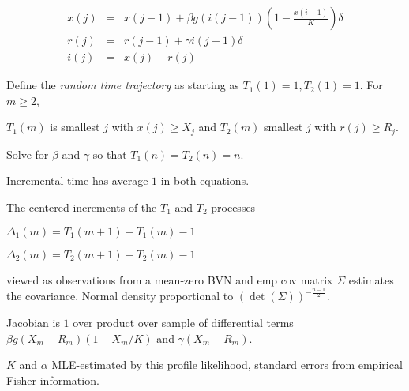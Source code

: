 \documentclass[notes]{beamer}
\begin{document}
\begin{frame}
\begin{eqnarray}
x(j)&=&x(j-1)+\beta g(i(j-1))(1-{\frac{x(i-1)}{K}}) \delta \nonumber \\
r(j)&=&r(j-1)+\gamma i(j-1) \delta \nonumber \\
i(j)&=&x(j)-r(j)\nonumber
\end{eqnarray}

\bigskip

\noindent Define the {\em random time trajectory} as starting as $T_1(1)=1, T_2(1)=1$. For $m \ge 2$,

\bigskip

\noindent $T_1(m)$ is smallest $j$ with $x(j) \ge X_j$ and $T_2(m)$ smallest $j$ with $r(j) \ge R_j$.

\bigskip

\noindent Solve for $\beta$ and $\gamma$ so that $T_1(n)=T_2(n)=n$. 

\noindent Incremental time has average $1$ in both equations. 

\end{frame}
\begin{frame}
\noindent The centered increments of the $T_1$ and $T_2$ processes

\bigskip

\noindent $\Delta_1(m)=T_1(m+1)-T_1(m)-1$ 

\noindent $\Delta_2(m)=T_2(m+1)-T_2(m)-1$

\noindent viewed as observations from a mean-zero BVN and emp cov matrix $\Sigma$ estimates the covariance.
Normal density proportional to $(\det(\Sigma))^{-{\frac{n-1}{2}}}$.

Jacobian is $1$ over product over sample of differential terms $\beta g(X_m-R_m)(1-X_m/K)$ and $\gamma (X_m-R_m)$.

\bigskip

\noindent $K$ and $\alpha$ MLE-estimated by this profile likelihood, standard errors from empirical Fisher information.

\end{frame}

\end{document}
